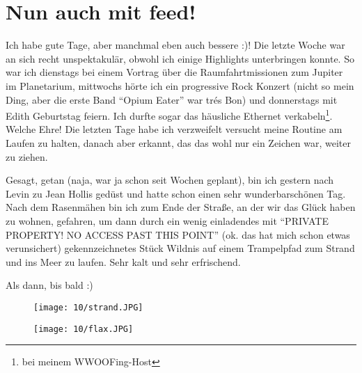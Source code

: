 \chapter{Nun auch mit feed!}

Ich habe gute Tage, aber manchmal eben auch bessere :)! Die letzte
Woche war an sich recht unspektakulär, obwohl ich einige Highlights
unterbringen konnte. So war ich dienstags bei einem Vortrag über die
Raumfahrtmissionen zum Jupiter im Planetarium, mittwochs hörte ich ein
progressive Rock Konzert (nicht so mein Ding, aber die erste Band
``Opium Eater'' war trés Bon) und donnerstags mit Edith Geburtstag
feiern. Ich durfte sogar das häusliche Ethernet verkabeln\footnote{bei
meinem WWOOFing-Host}. Welche Ehre!  Die letzten Tage habe ich
verzweifelt versucht meine Routine am Laufen zu halten, danach aber
erkannt, das das wohl nur ein Zeichen war, weiter zu ziehen.

Gesagt, getan (naja, war ja schon seit Wochen geplant), bin ich gestern
nach Levin zu Jean Hollis gedüst und hatte schon einen sehr
wunderbarschönen Tag. Nach dem Rasenmähen bin ich zum Ende der Straße,
an der wir das Glück haben zu wohnen, gefahren, um dann durch ein wenig
einladendes mit ``PRIVATE PROPERTY! NO ACCESS PAST THIS POINT'' (ok. das
hat mich schon etwas verunsichert) gekennzeichnetes Stück Wildnis auf
einem Trampelpfad zum Strand und ins Meer zu laufen. Sehr kalt und sehr
erfrischend.

Als dann, bis bald :)

\begin{figure}[h]
  \centering
  \texttt{[image: 10/strand.JPG]}
\end{figure}
\begin{figure}[h]
  \centering
  \texttt{[image: 10/flax.JPG]}
\end{figure}
